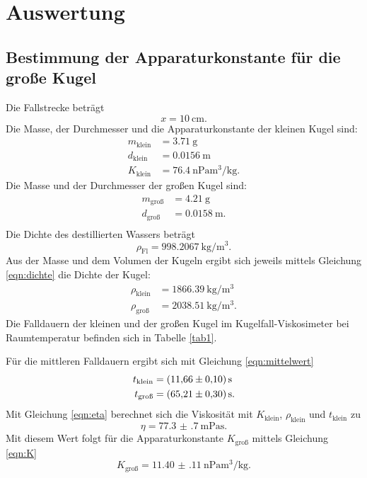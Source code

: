 \section{Auswertung}
\label{sec:Auswertung}

\subsection{Bestimmung der Apparaturkonstante für die große Kugel}
Die Fallstrecke beträgt 
\begin{equation*}
    x = \SI{10}{\centi\meter}.
\end{equation*}
Die Masse, der Durchmesser und die Apparaturkonstante der kleinen Kugel sind:
\begin{align*}
    m_\text{klein} &= \SI{3.71}{\gram} \\
    d_\text{klein} &= \SI{0.0156}{\meter} \\
    K_\text{klein} &= \SI{76.4}{\nano\pascal\cubic\meter\per\kilo\gram}.
\end{align*}
Die Masse und der Durchmesser der großen Kugel sind:
\begin{align*}
    m_\text{groß} &= \SI{4.21}{\gram} \\
    d_\text{groß} &= \SI{0.0158}{\meter}. \\
\end{align*}
Die Dichte des destillierten Wassers beträgt
\begin{equation*}
    \rho_\text{Fl} = \SI{998.2067}{\kilo\gram\per\cubic\meter}.
\end{equation*}
Aus der Masse und dem Volumen der Kugeln ergibt sich jeweils mittels Gleichung \eqref{eqn:dichte}
die Dichte der Kugel:
\begin{align*}
    \rho_\text{klein} &= \SI{1866.39}{\kilo\gram\per\cubic\meter} \\
    \rho_\text{groß} &= \SI{2038.51}{\kilo\gram\per\cubic\meter}.
\end{align*}
Die Falldauern der kleinen und der großen Kugel im Kugelfall-Viskosimeter
bei Raumtemperatur befinden sich in Tabelle \ref{tab1}.

\noindent Für die mittleren Falldauern ergibt sich mit Gleichung \eqref{eqn:mittelwert} %
\begin{align*}
    t_\text{klein} &= \SI{11.66 \pm 0.10}{\second} \\
    t_\text{groß} &= \SI{65.21 \pm 0.30}{\second}.
\end{align*}
Mit Gleichung \eqref{eqn:eta} berechnet sich die Viskosität mit $K_\text{klein}$,
$\rho_\text{klein}$ und $t_\text{klein}$ zu
\begin{equation*}
    \eta = \SI{77.3(7)}{\milli\pascal\second}.
\end{equation*}
Mit diesem Wert folgt für die Apparaturkonstante $K_\text{groß}$
mittels Gleichung \eqref{eqn:K}
\begin{equation*}
    K_\text{groß} = \SI{11.40(11)}{\nano\pascal\cubic\meter\per\kilo\gram}.
\end{equation*}

